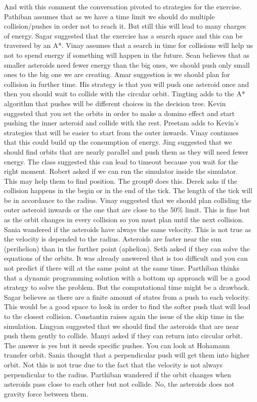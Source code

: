 And with this comment the conversation pivoted to strategies for the exercise. 
Pathiban assumes that as we have a time limit we should do multiple collision/pushes in order not to reach it. But still this will lead to many charges of energy.
Sagar suggested that the exercise has a search space and this can be traversed by an A*.
Vinay assumes that a search in time for collisions will help us not to spend energy if something will happen in the future.
Sean believes that as smaller asteroids need  fewer energy than the big ones, we should push only small ones to the big one we are creating.
Amar suggestion is we should plan for collision in further time. His strategy is that you will push one asteroid once and then you should wait to collide with the circular orbit.
Tingting adds to the A* algorithm that pushes will be different choices in the decision tree.
Kevin suggested that you set the orbits in order to make a domino effect and start pushing the inner asteroid and collide with the rest.
Preetam adds to Kevin’s strategies that will be easier to start from the outer inwards.
Vinay continues that this could build up the consumption of energy.
Jing suggested that we should find orbits that are nearly parallel and push them as they will need fewer energy.
The class suggested this can lead to timeout because you wait for the right moment.
Robert asked if we can run the simulator inside the simulator. This may help them to find position. The group0 does this.
Derek asks if the collision happens in the begin or in the end of the tick. The length of the tick will be in accordance to the radius.
Vinay suggested that we should plan colliding the outer asteroid inwards or the one that are close to the 50\% limit. 
This is fine but as the orbit changes in every collision so you must plan until the next collision.
Sania wandered if the asteroids have always the same velocity. This is not true 
as the velocity is depended to the radius. Asteroids are faster near the sun 
(perihelion) than in the further point (aphelion). 
Seth asked if they can solve the equations of the orbits. It was already answered that is too difficult and you can not predict if there will at the same point at the same time.
Parthiban thinks that a dynamic programming solution with a bottom up approach will be a good strategy to solve the problem. But the computational time might be a drawback.
Sagar believes as there are a finite amount of states from a push to each velocity. This would be a good space to look in order to find the softer push that will lead to the closest collision.
Constantin raises again the issue of the skip time in the simulation.
Lingyan suggested that we should find the asteroids that are near push them gently to collide.
Manyi asked if they can return into circular orbit. The answer is yes but it 
needs specific pushes. You can look at Hohamann transfer orbit.
Sania thought that a perpendicular push will get them into higher orbit. Not this is not true due to the fact that the velocity is not always perpendicular to the radius.
Parthiban wandered if the orbit changes when asteroids pass close to each other but not collide. 
No, the asteroids does not gravity force between them.
